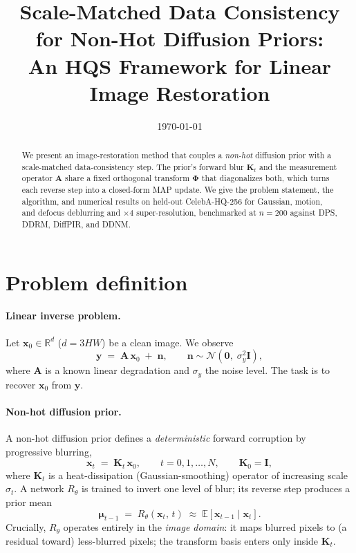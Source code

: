 \documentclass[11pt]{article}
\title{\textbf{Scale-Matched Data Consistency for Non-Hot Diffusion Priors:\\
An HQS Framework for Linear Image Restoration}}
\date{\today}
\newcommand{\bm}[1]{\boldsymbol{#1}}  %
\newcommand{\Phimat}{\bm{\Phi}}
\newcommand{\A}{\mathbf{A}}
\newcommand{\K}{\mathbf{K}}
\newcommand{\x}{\mathbf{x}}
\newcommand{\y}{\mathbf{y}}
\newcommand{\bmu}{\bm{\mu}}
\newcommand{\I}{\mathbf{I}}
\begin{document}
\maketitle

\begin{abstract}
We present an image-restoration method that couples a \emph{non-hot} diffusion prior with a
scale-matched data-consistency step. The prior's forward blur $\K_t$ and the measurement operator
$\A$ share a fixed orthogonal transform $\Phimat$ that diagonalizes both, which turns each reverse
step into a closed-form MAP update. We give the problem statement, the algorithm, and numerical
results on held-out CelebA-HQ-256 for Gaussian, motion, and defocus deblurring and $\times4$
super-resolution, benchmarked at $n{=}200$ against DPS, DDRM, DiffPIR, and DDNM.
\end{abstract}

\section{Problem definition}
\label{sec:problem}

\paragraph{Linear inverse problem.}
Let $\x_0\in\mathbb{R}^{d}$ ($d=3HW$) be a clean image. We observe
\begin{equation}
\y \;=\; \A\,\x_0 \;+\; \bm{n},\qquad \bm{n}\sim\mathcal{N}(\bm 0,\;\sigma_y^2\I),
\label{eq:model}
\end{equation}
where $\A$ is a known linear degradation and
$\sigma_y$ the noise level. The task is to recover $\x_0$ from $\y$.

\paragraph{Non-hot diffusion prior.}
A non-hot diffusion prior defines a
\emph{deterministic} forward corruption by progressive blurring,
\begin{equation}
\x_t \;=\; \K_t\,\x_0,\qquad t=0,1,\dots,N,\qquad \K_0=\I,
\label{eq:forward}
\end{equation}
where $\K_t$ is a heat-dissipation (Gaussian-smoothing) operator of increasing scale
$\sigma_t$. A network $R_\theta$ is trained to invert one level of blur; its
reverse step produces a prior mean
\begin{equation}
\bmu_{t-1} \;=\; R_\theta(\x_t,\,t)\;\approx\;\mathbb{E}[\x_{t-1}\mid \x_t].
\label{eq:reverse}
\end{equation}
Crucially, $R_\theta$ operates entirely in the \emph{image domain}: it maps blurred pixels
to (a residual toward) less-blurred pixels; the transform basis enters only inside $\K_t$.
\end{document}
